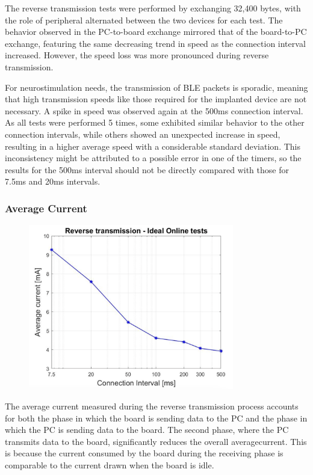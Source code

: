 \documentclass{Configuration_Files/PoliMi3i_thesis}
\begin{document}
The reverse transmission tests were performed by exchanging 32,400 bytes, with the role of peripheral alternated between the two devices for each test. The behavior observed in the PC-to-board exchange mirrored that of the board-to-PC exchange, featuring the same decreasing trend in speed as the connection interval increased. However, the speed loss was more pronounced during reverse transmission.

For neurostimulation needs, the transmission of BLE packets is sporadic, meaning that high transmission speeds like those required for the implanted device are not necessary. A spike in speed was observed again at the 500ms connection interval. As all tests were performed 5 times, some exhibited similar behavior to the other connection intervals, while others showed an unexpected increase in speed, resulting in a higher average speed with a considerable standard deviation. This inconsistency might be attributed to a possible error in one of the timers, so the results for the 500ms interval should not be directly compared with those for 7.5ms and 20ms intervals.

\subsubsection*{Average Current}

\begin{figure}[H]
    \centering
    \includegraphics[width=0.8\textwidth]{Results Manuel/figure40}
    \label{fig:figure1}
\end{figure}

The average current measured during the reverse transmission process accounts for both the phase in which the board is sending data to the PC and the phase in which the PC is sending data to the board. The second phase, where the PC transmits data to the board, significantly reduces the overall averagecurrent. This is because the current consumed by the board during the receiving phase is comparable to the current drawn when the board is idle.
\end{document}
